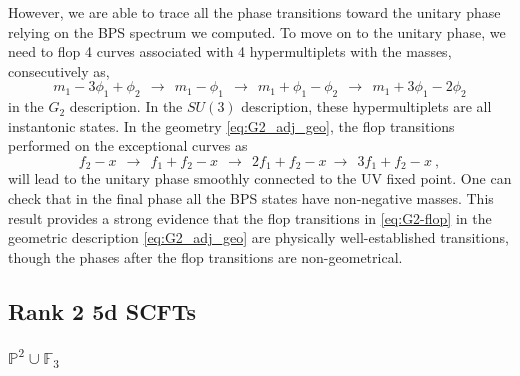 However, we are able to trace all the phase transitions toward the unitary phase relying on the BPS spectrum we computed. To move on  to the unitary phase, we need to  flop 4 curves associated with 4 hypermultiplets with the masses, consecutively as,
\begin{equation}
	m_1-3\phi_1+\phi_2 \ \ \rightarrow \ \ m_1 -\phi_1 \ \  \rightarrow \ \ m_1 + \phi_1-\phi_2 \ \ \rightarrow \ \ m_1 +3\phi_1-2\phi_2 
\end{equation}
in the $G_2$ description. In the $SU(3)$ description, these hypermultiplets are all instantonic states. In the geometry \eqref{eq:G2_adj_geo}, the flop transitions performed on the exceptional curves as
\begin{equation}\label{eq:G2-flop}
	f_2 -x \ \ \rightarrow \ \ f_1+f_2 -x \ \ \rightarrow \ \ 2f_1+f_2 -x \ \rightarrow \ \ 3f_1+f_2 -x \ ,
\end{equation}
will lead to the unitary phase smoothly connected to the UV fixed point. One can check that in the final phase all the BPS states have non-negative masses. This result provides a strong evidence that the flop transitions in \eqref{eq:G2-flop} in the geometric description \eqref{eq:G2_adj_geo} are physically well-established transitions, though the phases after the flop transitions are non-geometrical.


\subsection{Rank 2 5d SCFTs}\label{sec:rank2SCFTs}

\subsubsection{\texorpdfstring{$ \mathbb{P}^2 \cup \mathbb{F}_3 $}{P2 U F3}}

